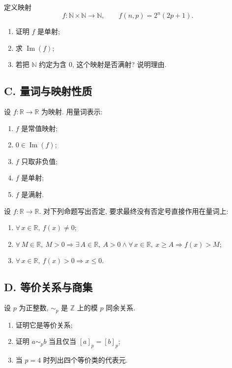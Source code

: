 \documentclass[usesamecnt, thmcnt=section, lang=cn, newtx, 10pt, scheme=chinese]{elegantbook}
\begin{document}
\begin{exercise}\label{ex:corr-end-06}
定义映射
\[
 f:\mathbb N\times\mathbb N\longrightarrow\mathbb N,
 \qquad
 f(n,p)=2^n(2p+1).
\]
\begin{enumerate}[label=\rm(\arabic*)]
  \item 证明 $f$ 是单射;
  \item 求 $\operatorname{Im}(f)$;
  \item 若把 $\mathbb N$ 约定为含 $0$, 这个映射是否满射? 说明理由.
\end{enumerate}
\end{exercise}

\subsection*{C. 量词与映射性质}

\begin{exercise}\label{ex:corr-end-07}
设 $f:\mathbb R\to\mathbb R$ 为映射. 用量词表示:
\begin{enumerate}[label=\rm(\arabic*)]
  \item $f$ 是常值映射;
  \item $0\in\operatorname{Im}(f)$;
  \item $f$ 只取非负值;
  \item $f$ 是单射;
  \item $f$ 是满射.
\end{enumerate}
\end{exercise}

\begin{exercise}\label{ex:corr-end-08}
设 $f:\mathbb R\to\mathbb R$. 对下列命题写出否定, 要求最终没有否定号直接作用在量词上:
\begin{enumerate}[label=\rm(\arabic*)]
  \item $\forall\,x\in\mathbb R,\ f(x)\neq0$;
  \item $\forall\,M\in\mathbb R,\ M>0\Rightarrow\exists\,A\in\mathbb R,\ A>0\wedge\forall\,x\in\mathbb R,\ x\geq A\Rightarrow f(x)>M$;
  \item $\forall\,x\in\mathbb R,\ f(x)>0\Rightarrow x\leq0$.
\end{enumerate}
\end{exercise}

\subsection*{D. 等价关系与商集}

\begin{exercise}\label{ex:corr-end-09}
设 $p$ 为正整数, $\sim_p$ 是 $\mathbb Z$ 上的模 $p$ 同余关系.
\begin{enumerate}[label=\rm(\arabic*)]
  \item 证明它是等价关系;
  \item 证明 $a\sim_p b$ 当且仅当 $[a]_p=[b]_p$;
  \item 当 $p=4$ 时列出四个等价类的代表元.
\end{enumerate}
\end{exercise}
\end{document}
